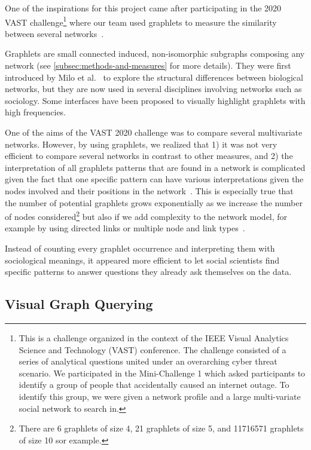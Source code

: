 One of the inspirations for this project came after participating in the 2020 VAST challenge\footnote{This is a challenge organized in the context of the IEEE Visual Analytics Science and Technology (VAST) conference. The challenge consisted of a series of analytical questions united under an overarching cyber threat scenario. We participated in the Mini-Challenge 1 which asked participants to identify a group of people that accidentally caused an internet outage. To identify this group, we were given a network profile and a large multi-variate social network to search in.} where our team used graphlets to measure the similarity between several networks~\cite{tovanichVAST2020Contest2021}.

Graphlets are small connected induced, non-isomorphic subgraphs composing any network (see \autoref{subsec:methods-and-measures} for more details).
They were first introduced by Milo et al.~\cite{miloNetworkMotifsSimple2002} to explore the structural differences between biological networks, but they are now used in several disciplines involving networks such as sociology\cite{charbeyStarsHolesPaths2019}.
Some interfaces have been proposed to visually highlight graphlets with high frequencies\cite{schreiberMAVistoToolExploration2005}.

One of the aims of the VAST 2020 challenge was to compare several multivariate networks.
However, by using graphlets, we realized that 1) it was not very efficient to compare several networks in contrast to other measures, and 2) the interpretation of all graphlets patterns that are found in a network is complicated given the fact that one specific pattern can have various interpretations given the nodes involved and their positions in the network~\cite{ingramNetworkMotifsStructure2006}.
This is especially true that the number of potential graphlets grows exponentially as we increase the number of nodes considered\footnote{There are 6 graphlets of size 4, 21 graphlets of size 5, and 11716571 graphlets of size 10 sor example\cite{sloaneHandbookIntegerSequences2014}.} but also if we add complexity to the network model, for example by using directed links or multiple node and link types~\cite{ribeiroDiscoveringColoredNetwork2014}.

Instead of counting every graphlet occurrence and interpreting them with sociological meanings, it appeared more efficient to let social scientists find specific patterns to answer questions they already ask themselves on the data.


\subsection{Visual Graph Querying}

